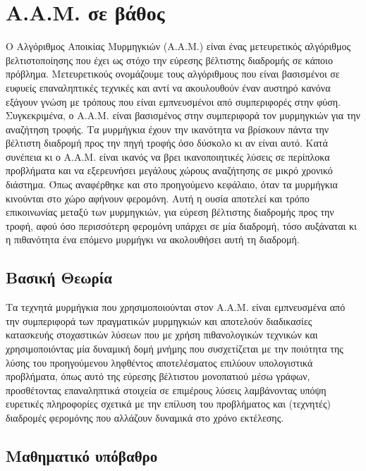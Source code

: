 \section{Α.Α.Μ. σε βάθος}
Ο Αλγόριθμος Αποικίας Μυρμηγκιών (Α.Α.Μ.) είναι ένας μετευρετικός αλγόριθμος βελτιστοποίησης που έχει ως στόχο την εύρεσης βέλτιστης διαδρομής σε κάποιο πρόβλημα. Μετευρετικούς ονομάζουμε τους αλγόριθμους που είναι βασισμένοι σε ευφυείς επαναληπτικές τεχνικές και αντί να ακουλουθούν έναν αυστηρό κανόνα εξάγουν γνώση με τρόπους που είναι εμπνευσμένοι από συμπεριφορές στην φύση. \cite{ribeiro2002ant} Συγκεκριμένα, ο Α.Α.Μ. είναι βασισμένος στην συμπεριφορά τον μυρμηγκιών για την αναζήτηση τροφής. 
Τα μυρμήγκια έχουν την ικανότητα να βρίσκουν πάντα την βέλτιστη διαδρομή προς την πηγή τροφής όσο δύσκολο κι αν είναι αυτό. Κατά συνέπεια κι ο Α.Α.Μ. είναι ικανός να βρει ικανοποιητικές λύσεις σε περίπλοκα προβλήματα και να εξερευνήσει μεγάλους χώρους αναζήτησης σε μικρό χρονικό διάστημα. Όπως αναφέρθηκε και στο προηγούμενο κεφάλαιο, όταν τα μυρμήγκια κινούνται στο χώρο αφήνουν φερομόνη. Αυτή η ουσία αποτελεί και τρόπο επικοινωνίας μεταξύ των μυρμηγκιών, για εύρεση βέλτιστης διαδρομής προς την τροφή, αφού όσο περισσότερη φερομόνη υπάρχει σε μία διαδρομή, τόσο αυξάναται κι η πιθανότητα ένα επόμενο μυρμήγκι να ακολουθήσει αυτή τη διαδρομή. 


\subsection{Βασική Θεωρία}
Τα τεχνητά μυρμήγκια που χρησιμοποιούνται στον Α.Α.Μ. είναι εμπνευσμένα από την συμπεριφορά των πραγματικών μυρμηγκιών και αποτελούν διαδικασίες κατασκευής στοχαστικών λύσεων που με χρήση πιθανολογικών τεχνικών και χρησιμοποιόντας μία δυναμική δομή μνήμης που συσχετίζεται με την ποιότητα της λύσης του προηγούμενου ληφθέντος αποτελέσματος επιλύουν υπολογιστικά προβλήματα, όπως αυτό της εύρεσης βέλτιστου μονοπατιού μέσω γράφων, προσθέτοντας επαναληπτικά στοιχεία σε επιμέρους λύσεις λαμβάνοντας υπόψη ευρετικές πληροφορίες σχετικά με την επίλυση του προβλήματος και (τεχνητές) διαδρομές φερομόνης που αλλάζουν δυναμικά στο χρόνο εκτέλεσης. \cite{dorigo2003ant} \cite{mavrovouniotis2017survey}

\subsection{Μαθηματικό υπόβαθρο}

